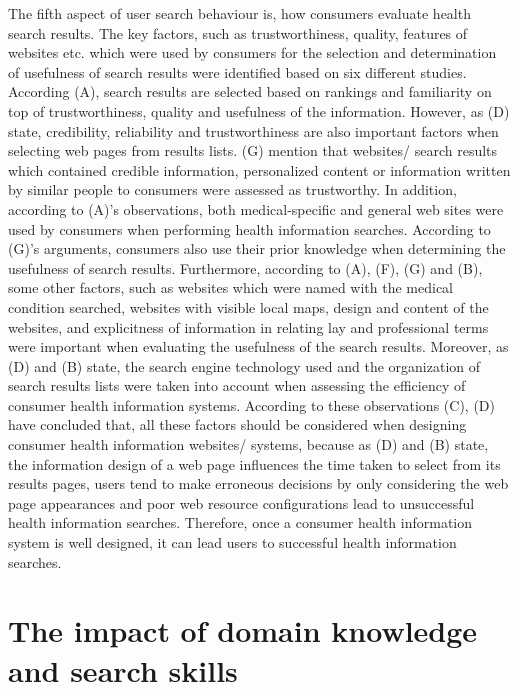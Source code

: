 \documentclass[]{article}
\begin{document}
The fifth aspect of user search behaviour is, how consumers evaluate health search results. The key factors, such as trustworthiness, quality, features of websites etc. which were used by consumers for the selection and determination of usefulness of search results were identified based on six different studies. According (A), search results are selected based on rankings and familiarity on top of trustworthiness, quality and usefulness of the information. However, as (D) state, credibility, reliability and trustworthiness are also important factors when selecting web pages from results lists. (G) mention that websites/ search results which contained credible information, personalized content or information written by similar people to consumers were assessed as trustworthy. In addition, according to (A)'s observations, both medical-specific and general web sites were used by consumers when performing health information searches. According to (G)'s arguments, consumers also use their prior knowledge when determining the usefulness of search results. Furthermore, according to (A), (F), (G) and (B), some other factors, such as websites which were named with the medical condition searched, websites with visible local maps, design and content of the websites, and explicitness of information in relating lay and professional terms were important when evaluating the usefulness of the search results. Moreover, as (D) and (B) state, the search engine technology used and the organization of search results lists were taken into account when assessing the efficiency of consumer health information systems. According to these observations (C), (D) have concluded that, all these factors should be considered when designing consumer health information websites/ systems, because as (D) and (B) state, the information design of a web page influences the time taken to select from its results pages, users tend to make erroneous decisions by only considering the web page appearances and poor web resource configurations lead to unsuccessful health information searches. Therefore, once a consumer health information system is well designed, it can lead users to successful health information searches. 

\section{The impact of domain knowledge and search skills}
\end{document}
